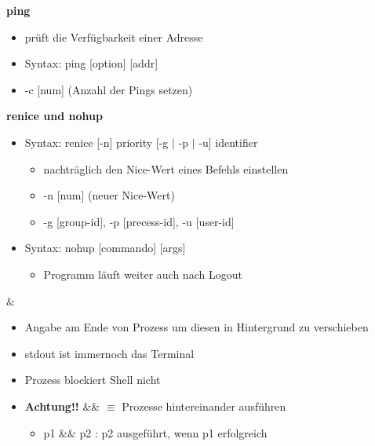 \documentclass[12pt,utf8, 10pt]{article}
\begin{document}
\textbf{ping}
\begin{itemize}
	\item prüft die Verfügbarkeit einer Adresse
	\item Syntax: ping [option] [addr] 
	\item -c [num] (Anzahl der Pings setzen)
\end{itemize}

\textbf{renice und nohup}
\begin{itemize}
	\item Syntax: renice [-n] priority [-g $\mid$ -p $\mid$ -u] identifier
	\begin{itemize}
		\item nachträglich den Nice-Wert eines Befehls einstellen
		\item -n [num] (neuer Nice-Wert)
		\item -g [group-id], -p [precess-id], -u [user-id]
	\end{itemize}
	\item Syntax: nohup [commando] [args]
	\begin{itemize}
		\item Programm läuft weiter auch nach Logout
	\end{itemize}
\end{itemize}

\textbf{$\&$}
\begin{itemize}
	\item Angabe am Ende von Prozess um diesen in Hintergrund zu verschieben
	\item stdout ist immernoch das Terminal
	\item Prozess blockiert Shell nicht
	\item \textbf{Achtung!!} $\&\&$ $\equiv$ Prozesse hintereinander ausführen
	\begin{itemize}
		\item p1 $\&\&$ p2 : p2 ausgeführt, wenn p1 erfolgreich
	\end{itemize}
\end{itemize}
\end{document}
